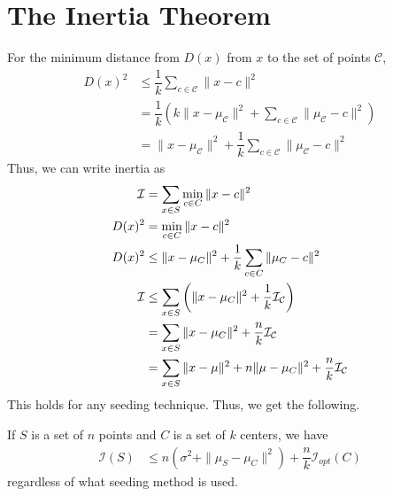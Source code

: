\documentclass[twoside, 11pt]{article}
\newcommand{\X}{\mathbf{X}}
\newcommand{\C}{\mathcal{C}}
\newcommand{\I}{\mathcal{I}}
\begin{document}
	\section{The Inertia Theorem}
	For the minimum distance from $D(x)$ from $x$ to the set of points $\C$,
		\begin{align*}
			D(x)^2 & \leq \dfrac{1}{k}\sum_{c\in \C}\|x-c\|^2\\
					& = \dfrac{1}{k}\left(k\|x-\mu_{\C}\|^2+\sum_{c\in\C}\|\mu_{\C}-c\|^2\right)\\
					& = \|x-\mu_{\C}\|^2+\dfrac{1}{k}\sum_{c\in\C}\|\mu_{\C}-c\|^2
		\end{align*}
	Thus, we can write inertia as 
		\begin{align*}
			\cal I & = \sum_{x\in S}\min_{c\in C}\|x-c\|^2\\
			D(x)^2 & = \min_{c\in C}\|x-c\|^2\\
			D(x)^2 & \leq \|x-\mu_{C}\|^2+\dfrac{1}{k}\sum_{c\in C}\|\mu_{C}-c\|^2\\
			\cal I & \leq \sum_{x\in S}\left(\|x-\mu_C\|^2+\dfrac1k\cal I_C\right)\\
			& = \sum_{x\in S}\|x-\mu_C\|^2+\dfrac nk\cal I_C\\
			& = \sum_{x\in S}\|x-\mu\|^2+n\|\mu-\mu_C\|^2+\dfrac nk\cal I_C
		\end{align*}
	This holds for any seeding technique. Thus, we get the following.
		\begin{theorem}
			If $S$ is a set of $n$ points and $C$ is a set of $k$ centers, we have
				\begin{align*}
					\I(S) & \leq n(\sigma^2+\|\mu_S-\mu_C\|^2)+\dfrac{n}{k}\I_{opt}(C)
				\end{align*}
			regardless of what seeding method is used.
		\end{theorem}
\end{document}
